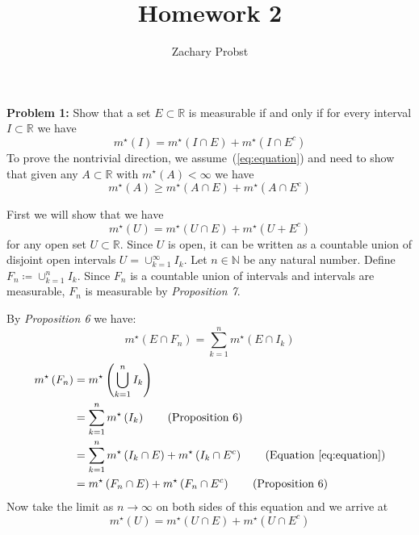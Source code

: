 \documentclass[11pt]{article}
\title{Homework 2}
\author{Zachary Probst}
\newcommand{\mstar}[1]{m^{\star}\left(#1\right)}
\begin{document}
    \maketitle

    \begin{mybox}
        \textbf{Problem 1:}
        Show that a set $E \subset \mathbb{R}$ is measurable if and only if for every interval $I \subset \mathbb{R}$ we have
        \begin{equation}
            \mstar{I} = \mstar{I \cap E} + \mstar{I \cap E^c}\label{eq:equation}
        \end{equation}
        To prove the nontrivial direction, we assume~(\ref{eq:equation}) and need to show that given any $A \subset \mathbb{R}$ with $\mstar{A} < \infty$ we have
        \begin{equation}
            \mstar{A} \geq \mstar{A \cap E} + \mstar{A \cap E^c}\label{eq:equation2}
        \end{equation}
    \end{mybox}

    First we will show that we have
    \[
        \mstar{U} = \mstar{U \cap E} + \mstar{U + E^c}
    \]
    for any open set $U \subset \mathbb{R}$.
    Since $U$ is open, it can be written as a countable union of disjoint open intervals $U = \cup_{k=1}^{\infty} I_k$.
    Let $n \in \mathbb{N}$ be any natural number.
    Define $F_n \coloneqq \cup_{k=1}^{n} I_k$.
    Since $F_n$ is a countable union of intervals and intervals are measurable, $F_n$ is measurable by \emph{Proposition 7}.

    By \emph{Proposition 6} we have:
    \[
        \mstar{E \cap F_n} = \sum_{k=1}^{n} \mstar{E \cap I_k}
    \]
    \begin{align*}
        \mstar{F_n} &= \mstar{\bigcup_{k=1}^{n} I_k} \\
        &= \sum_{k=1}^{n} \mstar{I_k} \tag{Proposition 6} \\
        &= \sum_{k=1}^{n} \mstar{I_k \cap E} + \mstar{I_k \cap E^c}\tag{Equation~\eqref{eq:equation}} \\
        &= \mstar{F_n \cap E} + \mstar{F_n \cap E^c} \tag{Proposition 6}\\
    \end{align*}
    Now take the limit as $n \rightarrow \infty$ on both sides of this equation and we arrive at
    \begin{equation}
        \mstar{U} = \mstar{U \cap E} + \mstar{U \cap E^c}\label{eq:equation3}
    \end{equation}
\end{document}
